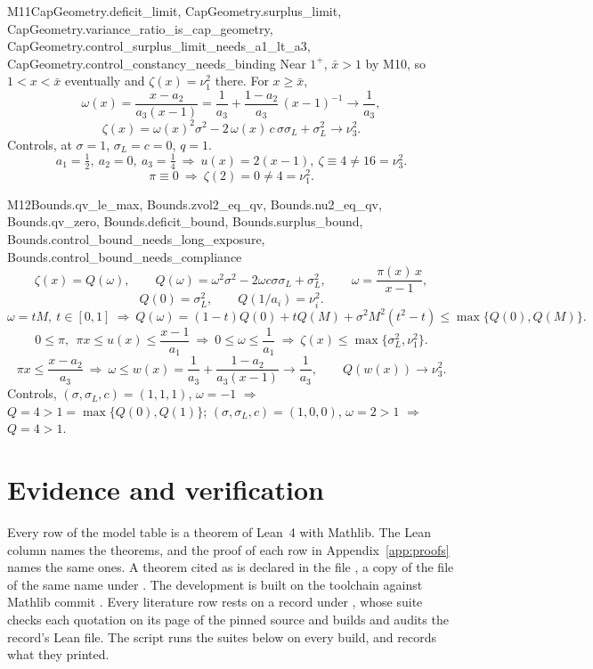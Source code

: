 \begin{mproof}{M11}{CapGeometry.deficit_limit, CapGeometry.surplus_limit, CapGeometry.variance_ratio_is_cap_geometry, CapGeometry.control_surplus_limit_needs_a1_lt_a3, CapGeometry.control_constancy_needs_binding}
Near $1^+$, $\bar x>1$ by M10, so $1<x<\bar x$ eventually and $\zeta(x)=\nu_1^2$ there.
For $x\ge\bar x$,
\[ \omega(x)=\frac{x-a_2}{a_3(x-1)}=\frac{1}{a_3}+\frac{1-a_2}{a_3}\,(x-1)^{-1}\to\frac{1}{a_3}, \]
\[ \zeta(x)=\omega(x)^2\sigma^2-2\,\omega(x)\,c\,\sigma\sigma_L+\sigma_L^2\to\nu_3^2 . \]
Controls, at $\sigma=1$, $\sigma_L=c=0$, $q=1$.
\[ a_1=\tfrac12,\ a_2=0,\ a_3=\tfrac14\ \Rightarrow\ u(x)=2(x-1),\ \zeta\equiv4\ne16=\nu_3^2. \]
\[ \pi\equiv0\ \Rightarrow\ \zeta(2)=0\ne4=\nu_1^2. \]
\end{mproof}

\begin{mproof}{M12}{Bounds.qv_le_max, Bounds.zvol2_eq_qv, Bounds.nu2_eq_qv, Bounds.qv_zero, Bounds.deficit_bound, Bounds.surplus_bound, Bounds.control_bound_needs_long_exposure, Bounds.control_bound_needs_compliance}
\[ \zeta(x)=Q(\omega),\qquad Q(\omega)=\omega^2\sigma^2-2\omega c\sigma\sigma_L+\sigma_L^2,\qquad \omega=\frac{\pi(x)\,x}{x-1}, \]
\[ Q(0)=\sigma_L^2,\qquad Q(1/a_i)=\nu_i^2 . \]
\[ \omega=tM,\ t\in[0,1]\ \Rightarrow\ Q(\omega)=(1-t)Q(0)+tQ(M)+\sigma^2M^2(t^2-t)\le\max\{Q(0),Q(M)\} . \]
\[ 0\le\pi,\ \ \pi x\le u(x)\le\frac{x-1}{a_1}\ \Rightarrow\ 0\le\omega\le\frac1{a_1}\ \Rightarrow\ \zeta(x)\le\max\{\sigma_L^2,\nu_1^2\} . \]
\[ \pi x\le\frac{x-a_2}{a_3}\ \Rightarrow\ \omega\le w(x)=\frac1{a_3}+\frac{1-a_2}{a_3(x-1)}\to\frac1{a_3},\qquad Q(w(x))\to\nu_3^2 . \]
Controls, $(\sigma,\sigma_L,c)=(1,1,1)$, $\omega=-1$ $\Rightarrow$ $Q=4>1=\max\{Q(0),Q(1)\}$; $(\sigma,\sigma_L,c)=(1,0,0)$, $\omega=2>1$ $\Rightarrow$ $Q=4>1$.
\end{mproof}

\section{Evidence and verification}
\label{app:evidence}

Every row of the model table is a theorem of Lean~4 with Mathlib. The Lean
column names the theorems, and the proof of each row in
Appendix~\ref{app:proofs} names the same ones. A theorem cited as
 is declared in the file
, a copy of the file of the same name under
. The development is built on the toolchain
 against Mathlib commit . Every literature row
rests on a record under , whose suite checks each quotation on its
page of the pinned source and builds and audits the record's Lean file. The
script  runs the suites below on every build, and
 records what they printed.

